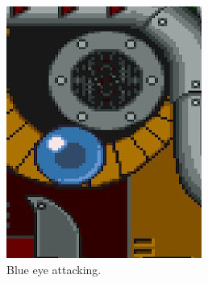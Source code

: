 \begin{figure}[htp]
\begin{figure}[htp]
\begin{subfigure}[t]{0.30\linewidth}
		\includegraphics[width=\linewidth]{figures/X1/Sigma_stages/Rangda_blue.jpg}
		\caption{Blue eye attacking.}
	\end{subfigure}
	\begin{subfigure}[t]{0.30\linewidth}
		\centering

\end{subfigure}
\end{figure}
\end{figure}
